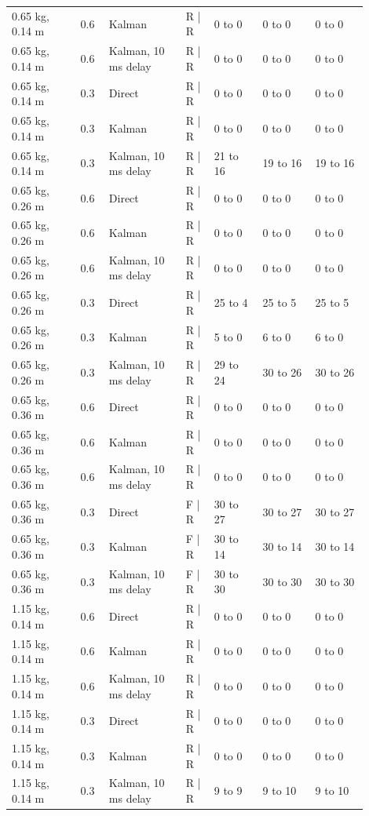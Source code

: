 \documentclass[11pt,a4paper]{article}
\begin{document}
\begin{longtable}{p{0.171\linewidth}p{0.072\linewidth}p{0.198\linewidth}p{0.072\linewidth}p{0.126\linewidth}p{0.131\linewidth}p{0.131\linewidth}}
0.65 kg, 0.14 m & 0.6 & Kalman & R | R & 0 to 0 & 0 to 0 & 0 to 0 \\
0.65 kg, 0.14 m & 0.6 & Kalman, 10 ms delay & R | R & 0 to 0 & 0 to 0 & 0 to 0 \\
0.65 kg, 0.14 m & 0.3 & Direct & R | R & 0 to 0 & 0 to 0 & 0 to 0 \\
0.65 kg, 0.14 m & 0.3 & Kalman & R | R & 0 to 0 & 0 to 0 & 0 to 0 \\
0.65 kg, 0.14 m & 0.3 & Kalman, 10 ms delay & R | R & 21 to 16 & 19 to 16 & 19 to 16 \\
0.65 kg, 0.26 m & 0.6 & Direct & R | R & 0 to 0 & 0 to 0 & 0 to 0 \\
0.65 kg, 0.26 m & 0.6 & Kalman & R | R & 0 to 0 & 0 to 0 & 0 to 0 \\
0.65 kg, 0.26 m & 0.6 & Kalman, 10 ms delay & R | R & 0 to 0 & 0 to 0 & 0 to 0 \\
0.65 kg, 0.26 m & 0.3 & Direct & R | R & 25 to 4 & 25 to 5 & 25 to 5 \\
0.65 kg, 0.26 m & 0.3 & Kalman & R | R & 5 to 0 & 6 to 0 & 6 to 0 \\
0.65 kg, 0.26 m & 0.3 & Kalman, 10 ms delay & R | R & 29 to 24 & 30 to 26 & 30 to 26 \\
0.65 kg, 0.36 m & 0.6 & Direct & R | R & 0 to 0 & 0 to 0 & 0 to 0 \\
0.65 kg, 0.36 m & 0.6 & Kalman & R | R & 0 to 0 & 0 to 0 & 0 to 0 \\
0.65 kg, 0.36 m & 0.6 & Kalman, 10 ms delay & R | R & 0 to 0 & 0 to 0 & 0 to 0 \\
0.65 kg, 0.36 m & 0.3 & Direct & F | R & 30 to 27 & 30 to 27 & 30 to 27 \\
0.65 kg, 0.36 m & 0.3 & Kalman & F | R & 30 to 14 & 30 to 14 & 30 to 14 \\
0.65 kg, 0.36 m & 0.3 & Kalman, 10 ms delay & F | R & 30 to 30 & 30 to 30 & 30 to 30 \\
1.15 kg, 0.14 m & 0.6 & Direct & R | R & 0 to 0 & 0 to 0 & 0 to 0 \\
1.15 kg, 0.14 m & 0.6 & Kalman & R | R & 0 to 0 & 0 to 0 & 0 to 0 \\
1.15 kg, 0.14 m & 0.6 & Kalman, 10 ms delay & R | R & 0 to 0 & 0 to 0 & 0 to 0 \\
1.15 kg, 0.14 m & 0.3 & Direct & R | R & 0 to 0 & 0 to 0 & 0 to 0 \\
1.15 kg, 0.14 m & 0.3 & Kalman & R | R & 0 to 0 & 0 to 0 & 0 to 0 \\
1.15 kg, 0.14 m & 0.3 & Kalman, 10 ms delay & R | R & 9 to 9 & 9 to 10 & 9 to 10 \\

\end{longtable}
\end{document}
